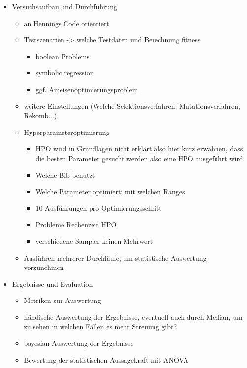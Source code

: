 \begin{itemize}
    \item Versuchsaufbau und Durchführung
    \begin{itemize}
        \item an Hennings Code orientiert
        \item Testszenarien -> welche Testdaten und Berechnung fitness
        \begin{itemize}
            \item boolean Problems
            \item symbolic regression
            \item ggf. Ameisenoptimierungsproblem
        \end{itemize}
        \item weitere Einstellungen (Welche Selektionsverfahren, Mutationsverfahren, Rekomb...)
        \item Hyperparameteroptimierung
        \begin{itemize}
        	\item HPO wird in Grundlagen nicht erklärt also hier kurz erwähnen, dass die besten Parameter gesucht werden also eine HPO ausgeführt wird
            \item Welche Bib benutzt
            \item Welche Parameter optimiert; mit welchen Ranges
            \item 10 Ausführungen pro Optimierungsschritt
            \item Probleme Rechenzeit HPO
            \item verschiedene Sampler keinen Mehrwert
        \end{itemize}
        \item Ausführen mehrerer Durchläufe, um statistische Auswertung vorzunehmen
    \end{itemize}
    \item Ergebnisse und Evaluation
    \begin{itemize}
        \item Metriken zur Auswertung
        \item händische Auswertung der Ergebnisse, eventuell auch durch Median, um zu sehen in welchen Fällen es mehr Streuung gibt?
        \item bayesian Auswertung der Ergebnisse
        \item Bewertung der statistischen Aussagekraft mit ANOVA
    \end{itemize}
\end{itemize}